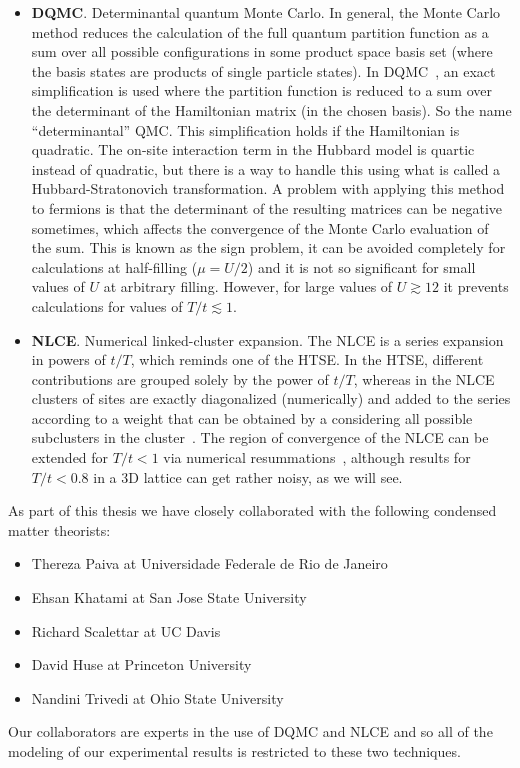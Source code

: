 \begin{itemize}
\item \textbf{DQMC}.  Determinantal quantum Monte Carlo.  In general, the Monte
Carlo  method reduces the calculation of the full quantum partition function as
a sum over all possible configurations in some product space basis set (where
the basis states are products of single particle states).  In
DQMC~\cite{Scalettar:hubbardIII,PhysRevD.24.2278}, an exact simplification is
used where the partition function is reduced to a sum over the determinant of
the Hamiltonian matrix (in the chosen basis).  So the name ``determinantal''
QMC.  This simplification holds if the Hamiltonian is quadratic.  The on-site
interaction term in the Hubbard model is quartic instead of quadratic, but
there is a way to handle this using what is called a Hubbard-Stratonovich
transformation.  A problem with applying this method to fermions is that the
determinant of the resulting matrices can be negative sometimes, which affects
the convergence of the Monte Carlo evaluation of the sum.   This is known as
the sign problem,  it can be avoided completely for calculations at
half-filling ($\mu=U/2$) and it is not so significant for small values of $U$ at
arbitrary filling.  However, for large values of $U \gtrsim 12$ it prevents
calculations for values of $T/t \lesssim 1$. 

\item \textbf{NLCE}. Numerical linked-cluster expansion.   The NLCE is a series
expansion in powers of $t/T$, which reminds one of the HTSE.  In the HTSE,
different contributions are grouped solely by the power of $t/T$, whereas in
the NLCE clusters of sites are exactly diagonalized (numerically) and added to
the series according to a weight that can be obtained by a considering all
possible subclusters in the cluster~\cite{PhysRevLett.97.187202}.   The region
of convergence of the NLCE can be extended for  $T/t<1$ via numerical
resummations~\cite{Tang2013}, although results for $T/t<0.8$ in a 3D lattice
can get rather noisy, as we will see. 

\end{itemize}

As part of this thesis we have closely collaborated with the following condensed matter theorists:
\begin{itemize}
\item Thereza Paiva at Universidade Federale de Rio de Janeiro  
\item Ehsan Khatami at San Jose State University
\item Richard Scalettar at UC Davis
\item David Huse at Princeton University
\item Nandini Trivedi at Ohio State University
\end{itemize}  

Our collaborators are experts in the use of DQMC and NLCE and so all of the
modeling of our experimental results is restricted to these two techniques.
